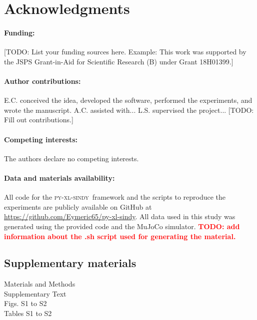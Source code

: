 \documentclass[12pt]{article}
\newcommand{\frameworkname}{\textsc{py-xl-sindy}}
\newcommand{\TODO}[1]{\textbf{\textcolor{red}{\Large TODO: \normalsize #1}}}
\begin{document}

\clearpage






\section*{Acknowledgments}
\paragraph*{Funding:}
[TODO: List your funding sources here. Example: This work was supported by the JSPS Grant-in-Aid for Scientific Research (B) under Grant 18H01399.]
\paragraph*{Author contributions:}
E.C. conceived the idea, developed the software, performed the experiments, and wrote the manuscript. A.C. assisted with... L.S. supervised the project... [TODO: Fill out contributions.]
\paragraph*{Competing interests:}
The authors declare no competing interests.
\paragraph*{Data and materials availability:}
All code for the \frameworkname\ framework and the scripts to reproduce the experiments are publicly available on GitHub at \url{https://github.com/Eymeric65/py-xl-sindy}. All data used in this study was generated using the provided code and the MuJoCo simulator. \TODO{ add information about the .sh script used for generating the material.}


\subsection*{Supplementary materials}
Materials and Methods\\
Supplementary Text\\
Figs. S1 to S2\\
Tables S1 to S2\\
\end{document}
